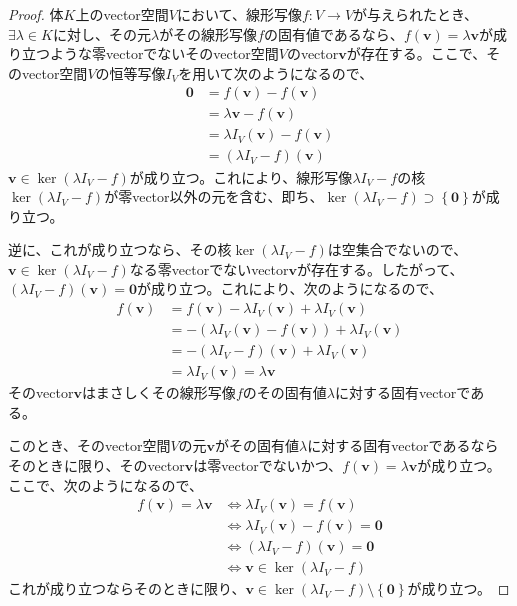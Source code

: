 \documentclass[dvipdfmx]{jsarticle}
\begin{document}
\begin{proof}
体$K$上のvector空間$V$において、線形写像$f:V \rightarrow V$が与えられたとき、$\exists\lambda \in K$に対し、その元$\lambda$がその線形写像$f$の固有値であるなら、$f\left( \mathbf{v} \right) = \lambda\mathbf{v}$が成り立つような零vectorでないそのvector空間$V$のvector$\mathbf{v}$が存在する。ここで、そのvector空間$V$の恒等写像$I_{V}$を用いて次のようになるので、
\begin{align*}
\mathbf{0} &= f\left( \mathbf{v} \right) - f\left( \mathbf{v} \right)\\
&= \lambda\mathbf{v} - f\left( \mathbf{v} \right)\\
&= \lambda I_{V}\left( \mathbf{v} \right) - f\left( \mathbf{v} \right)\\
&= \left( \lambda I_{V} - f \right)\left( \mathbf{v} \right)
\end{align*}
$\mathbf{v} \in \ker\left( \lambda I_{V} - f \right)$が成り立つ。これにより、線形写像$\lambda I_{V} - f$の核$\ker\left( \lambda I_{V} - f \right)$が零vector以外の元を含む、即ち、$\ker\left( \lambda I_{V} - f \right) \supset \left\{ \mathbf{0} \right\}$が成り立つ。\par
逆に、これが成り立つなら、その核$\ker\left( \lambda I_{V} - f \right)$は空集合でないので、$\mathbf{v} \in \ker\left( \lambda I_{V} - f \right)$なる零vectorでないvector$\mathbf{v}$が存在する。したがって、$\left( \lambda I_{V} - f \right)\left( \mathbf{v} \right) = \mathbf{0}$が成り立つ。これにより、次のようになるので、
\begin{align*}
f\left( \mathbf{v} \right) &= f\left( \mathbf{v} \right) - \lambda I_{V}\left( \mathbf{v} \right) + \lambda I_{V}\left( \mathbf{v} \right)\\
&= - \left( \lambda I_{V}\left( \mathbf{v} \right) - f\left( \mathbf{v} \right) \right) + \lambda I_{V}\left( \mathbf{v} \right)\\
&= - \left( \lambda I_{V} - f \right)\left( \mathbf{v} \right) + \lambda I_{V}\left( \mathbf{v} \right)\\
&= \lambda I_{V}\left( \mathbf{v} \right) = \lambda\mathbf{v}
\end{align*}
そのvector$\mathbf{v}$はまさしくその線形写像$f$のその固有値$\lambda$に対する固有vectorである。\par
このとき、そのvector空間$V$の元$\mathbf{v}$がその固有値$\lambda$に対する固有vectorであるならそのときに限り、そのvector$\mathbf{v}$は零vectorでないかつ、$f\left( \mathbf{v} \right) = \lambda\mathbf{v}$が成り立つ。ここで、次のようになるので、
\begin{align*}
f\left( \mathbf{v} \right) = \lambda\mathbf{v} &\Leftrightarrow \lambda I_{V}\left( \mathbf{v} \right) = f\left( \mathbf{v} \right)\\
&\Leftrightarrow \lambda I_{V}\left( \mathbf{v} \right) - f\left( \mathbf{v} \right) = \mathbf{0}\\
&\Leftrightarrow \left( \lambda I_{V} - f \right)\left( \mathbf{v} \right) = \mathbf{0}\\
&\Leftrightarrow \mathbf{v} \in \ker\left( \lambda I_{V} - f \right)
\end{align*}
これが成り立つならそのときに限り、$\mathbf{v} \in \ker\left( \lambda I_{V} - f \right) \setminus \left\{ \mathbf{0} \right\}$が成り立つ。
\end{proof}
\end{document}
